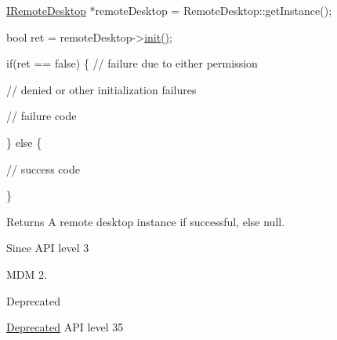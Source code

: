\begin{DoxyPre}  \hyperlink{classknoxremotedesktop_1_1IRemoteDesktop}{IRemoteDesktop} *remoteDesktop = RemoteDesktop::getInstance();\end{DoxyPre}



\begin{DoxyPre}  bool ret = remoteDesktop->\hyperlink{classknoxremotedesktop_1_1IRemoteDesktop_a7bed40d98c61713a69cf1dad8b37beae}{init()};\end{DoxyPre}



\begin{DoxyPre}  if(ret == false)  \{ // failure due to either permission\end{DoxyPre}



\begin{DoxyPre}                      // denied or other initialization failures\end{DoxyPre}



\begin{DoxyPre}     // failure code\end{DoxyPre}



\begin{DoxyPre}  \} else \{\end{DoxyPre}



\begin{DoxyPre}     // success code\end{DoxyPre}



\begin{DoxyPre}  \}\end{DoxyPre}



\begin{DoxyPre} \end{DoxyPre}


\begin{DoxyReturn}{\-Returns}
\-A remote desktop instance if successful, else {\ttfamily null}.
\end{DoxyReturn}
\begin{DoxySince}{\-Since}
\-A\-P\-I level 3

\-M\-D\-M 2.
\end{DoxySince}
\begin{DoxyRefDesc}{\-Deprecated}
\item[\hyperlink{deprecated__deprecated000018}{\-Deprecated}]\-A\-P\-I level 35\end{DoxyRefDesc}


